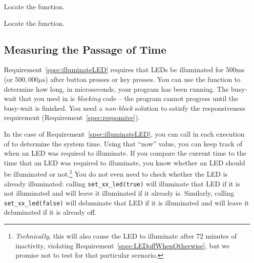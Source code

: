 Locate the  function.
\begin{description}
\end{description}

Locate the  function.
\begin{description}
\end{description}


\subsection{Measuring the Passage of Time}

Requirement~\ref{spec:illuminateLED} requires that LEDs be illuminated for 500ms (or $500,000\mu\mathrm{s}$) after button presses or key presses.
You can use the  function to determine how long, in microseconds, your program has been running.
The busy-wait that you used in  is \textit{blocking} code -- the program cannot progress until the busy-wait is finished.
You need a \textit{non-block} solution to satisfy the responsiveness requirement (Requirement~\ref{spec:responsive}).

In the case of Requirement~\ref{spec:illuminateLED}, you can call  in each execution of  to determine the system time.
Using that ``now'' value, you can keep track of when an LED was required to illuminate.
If you compare the current time to the time that an LED was required to illuminate, you know whether an LED should be illuminated or not.\footnote{
    \textit{Technically}, this will also cause the LED to illuminate after 72 minutes of inactivity, violating Requirement~\ref{spec:LEDoffWhenOtherwise}, but we promise not to test for that particular scenario.
}
You do not even need to check whether the LED is already illuminated:
calling \lstinline{set_xx_led(true)} will illuminate that LED if it is not illuminated and will leave it illuminated if it already is.
Similarly, calling \lstinline{set_xx_led(false)} will deluminate that LED if it is illuminated and will leave it deluminated if it is already off.

